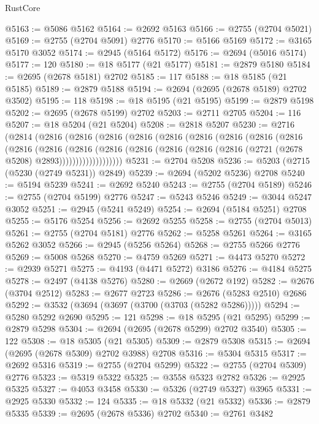 \begin{lexlean}{RustCore}
\begin{coremodule}
@5163 := @5086 @5162
@5164 := @2692 @5163
@5166 := @2755 (@2704 @5021)
@5169 := @2755 (@2704 @5091) @2776
@5170 := @5166 @5169
@5172 := @3165 @5170 @3052
@5174 := @2945 (@5164 @5172)
@5176 := @2694 (@5016 @5174)
@5177 := 120
@5180 := @18 @5177 (@21 @5177)
@5181 := @2879 @5180
@5184 := @2695 (@2678 @5181) @2702
@5185 := 117
@5188 := @18 @5185 (@21 @5185)
@5189 := @2879 @5188
@5194 := @2694 (@2695 (@2678 @5189) @2702 @3502)
@5195 := 118
@5198 := @18 @5195 (@21 @5195)
@5199 := @2879 @5198
@5202 := @2695 (@2678 @5199) @2702
@5203 := @2711 @2705
@5204 := 116
@5207 := @18 @5204 (@21 @5204)
@5208 := @2818 @5207
@5230 := @2716
    (@2814
      (@2816
        (@2816
          (@2816
            (@2816
              (@2816
                (@2816
                  (@2816
                    (@2816
                      (@2816
                        (@2816
                          (@2816
                            (@2816
                              (@2816
                                (@2816
                                  (@2816 (@2816 (@2816 (@2721 (@2678 @5208) @2893)))))))))))))))))))
@5231 := @2704 @5208
@5236 := @5203 (@2715 (@5230 (@2749 @5231)) @2849)
@5239 := @2694 (@5202 @5236) @2708
@5240 := @5194 @5239
@5241 := @2692 @5240
@5243 := @2755 (@2704 @5189)
@5246 := @2755 (@2704 @5199) @2776
@5247 := @5243 @5246
@5249 := @3044 @5247 @3052
@5251 := @2945 (@5241 @5249)
@5254 := @2694 (@5184 @5251) @2708
@5255 := @5176 @5254
@5256 := @2692 @5255
@5258 := @2755 (@2704 @5013)
@5261 := @2755 (@2704 @5181) @2776
@5262 := @5258 @5261
@5264 := @3165 @5262 @3052
@5266 := @2945 (@5256 @5264)
@5268 := @2755 @5266 @2776
@5269 := @5008 @5268
@5270 := @4759 @5269
@5271 := @4473 @5270
@5272 := @2939 @5271
@5275 := @4193 (@4471 @5272) @3186
@5276 := @4184 @5275
@5278 := @2497 (@4138 @5276)
@5280 := @2669 (@2672 @192)
@5282 := @2676 (@3704 @2512)
@5283 := @2677 @2723
@5286 := @2676 (@5283 @2510) @2686
@5292 := @3532 (@3694 (@3697 (@3700 (@3703 (@5282 @5286)))))
@5294 := @5280 @5292 @2690
@5295 := 121
@5298 := @18 @5295 (@21 @5295)
@5299 := @2879 @5298
@5304 := @2694 (@2695 (@2678 @5299) @2702 @3540)
@5305 := 122
@5308 := @18 @5305 (@21 @5305)
@5309 := @2879 @5308
@5315 := @2694 (@2695 (@2678 @5309) @2702 @3988) @2708
@5316 := @5304 @5315
@5317 := @2692 @5316
@5319 := @2755 (@2704 @5299)
@5322 := @2755 (@2704 @5309) @2776
@5323 := @5319 @5322
@5325 := @3558 @5323 @2782
@5326 := @2925 @5325
@5327 := @4053 @3458
@5330 := @5326 (@2749 @5327) @3965
@5331 := @2925 @5330
@5332 := 124
@5335 := @18 @5332 (@21 @5332)
@5336 := @2879 @5335
@5339 := @2695 (@2678 @5336) @2702
@5340 := @2761 @3482

\end{coremodule}
\end{lexlean}
